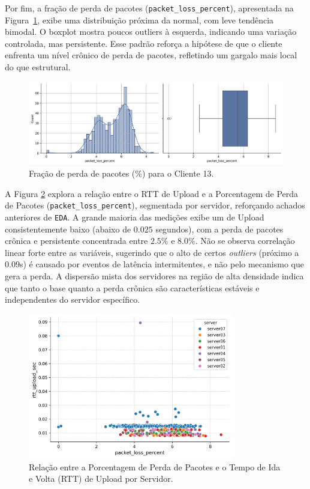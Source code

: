 \documentclass{article}
\begin{document}
Por fim, a fração de perda de pacotes (\texttt{packet\_loss\_percent}), apresentada na Figura~\ref{fig:chart_packet_loss_percent_client13}, exibe uma distribuição próxima da normal, com leve tendência bimodal.  
O boxplot mostra poucos outliers à esquerda, indicando uma variação controlada, mas persistente. Esse padrão reforça a hipótese de que o cliente enfrenta um nível crônico de perda de pacotes, refletindo um gargalo mais local do que estrutural.

\begin{figure}[htp]
	\includegraphics[width=\textwidth]{../figures/eda/chart_packet_loss_percent_client13.png}
	\caption{Fração de perda de pacotes (\%) para o Cliente 13.}
	\label{fig:chart_packet_loss_percent_client13}
\end{figure}

A Figura \ref{fig:scatter_client13} explora a relação entre o RTT de Upload e a Porcentagem de Perda de Pacotes (\texttt{packet\_loss\_percent}), segmentada por servidor, reforçando achados anteriores de \texttt{EDA}. A grande maioria das medições exibe um  de Upload consistentemente baixo (abaixo de $0.025$ segundos), com a perda de pacotes crônica e persistente concentrada entre $2.5\%$ e $8.0\%$. Não se observa correlação linear forte entre as variáveis, sugerindo que o  alto de certos \textit{outliers} (próximo a $0.09$s) é causado por eventos de latência intermitentes, e não pelo mecanismo que gera a perda. A dispersão mista dos servidores na região de alta densidade indica que tanto o  base quanto a perda crônica são características estáveis e independentes do servidor específico.

\begin{figure}[htp]
	\centering
	\includegraphics[width=0.8\textwidth]{../figures/eda/scatter_client13.png}
	\caption{Relação entre a Porcentagem de Perda de Pacotes e o Tempo de Ida e Volta (RTT) de Upload por Servidor.}
	\label{fig:scatter_client13}
\end{figure}
\end{document}

